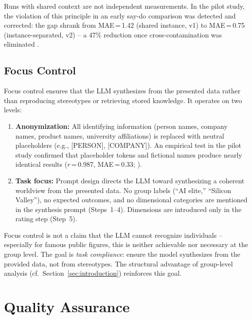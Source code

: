 \documentclass[11pt,a4paper]{article}
\begin{document}
Runs with shared context are not independent measurements. In the pilot study, the violation of this principle in an early say-do comparison was detected and corrected: the gap shrank from MAE\,=\,1.42 (shared instance, v1) to MAE\,=\,0.75 (instance-separated, v2) -- a 47\% reduction once cross-contamination was eliminated \citep{Geiger2026PaperA}.


\subsection{Focus Control}
\label{sec:method:focus}

Focus control ensures that the LLM synthesizes from the presented data rather than reproducing stereotypes or retrieving stored knowledge. It operates on two levels:

\begin{enumerate}[nosep]
  \item \textbf{Anonymization:} All identifying information (person names, company names, product names, university affiliations) is replaced with neutral placeholders (e.g., [PERSON], [COMPANY]). An empirical test in the pilot study confirmed that placeholder tokens and fictional names produce nearly identical results ($r$\,=\,0.987, MAE\,=\,0.33; \citealp{Geiger2026PaperA}).
  \item \textbf{Task focus:} Prompt design directs the LLM toward synthesizing a coherent worldview from the presented data. No group labels (``AI elite,'' ``Silicon Valley''), no expected outcomes, and no dimensional categories are mentioned in the synthesis prompt (Steps~1--4). Dimensions are introduced only in the rating step (Step~5).
\end{enumerate}

Focus control is not a claim that the LLM cannot recognize individuals -- especially for famous public figures, this is neither achievable nor necessary at the group level. The goal is \emph{task compliance}: ensure the model synthesizes from the provided data, not from stereotypes. The structural advantage of group-level analysis (cf.\ Section~\ref{sec:introduction}) reinforces this goal.


\section{Quality Assurance}
\label{sec:qa}
\end{document}
